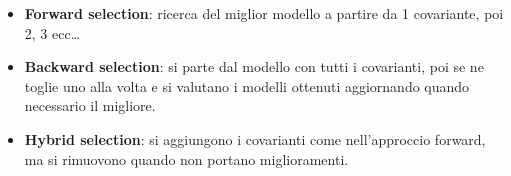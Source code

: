 \begin{itemize}
 \item \textbf{Forward selection}: ricerca del
miglior modello a partire da 1 covariante, poi 2, 3 ecc\dots
 \item \textbf{Backward selection}: si parte dal modello con
tutti i covarianti, poi se ne toglie uno alla volta e si
valutano i modelli ottenuti aggiornando quando necessario il
migliore.
 \item \textbf{Hybrid selection}: si aggiungono i covarianti
come nell'approccio forward, ma si rimuovono quando non
portano miglioramenti.
\end{itemize}


